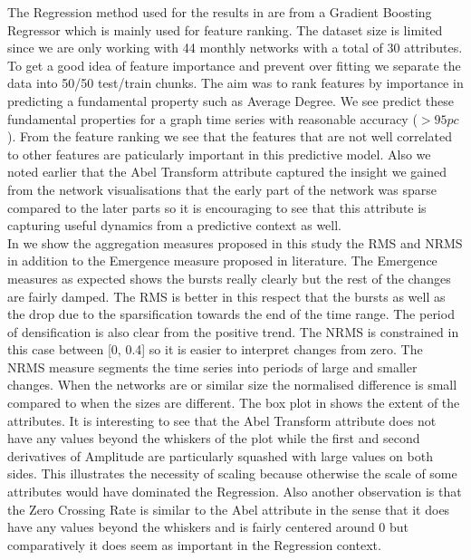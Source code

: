 The Regression method used for the results in  are from a Gradient Boosting Regressor which is mainly used for feature ranking. The dataset size is limited since we are only working with 44 monthly networks with a total of 30 attributes. To get a good idea of feature importance and prevent over fitting we separate the data into 50/50 test/train chunks. The aim was to rank features by importance in predicting a fundamental property such as Average Degree. We see predict these fundamental properties for a graph time series with reasonable accuracy ($> 95pc$). From the feature ranking we see that the features that are not well correlated to other features are paticularly important in this predictive model. Also we noted earlier that the Abel Transform attribute captured the insight we gained from the network visualisations that the early part of the network was sparse compared to the later parts so it is encouraging to see that this attribute is capturing useful dynamics from a predictive context as well. \\

In  we show the aggregation measures proposed in this study the RMS and NRMS in addition to the Emergence measure proposed in literature. The Emergence measures as expected shows the bursts really clearly but the rest of the changes are fairly damped. The RMS is better in this respect that the bursts as well as the drop due to the sparsification towards the end of the time range. The period of densification is also clear from the positive trend. The NRMS is constrained in this case between [0, 0.4] so it is easier to interpret changes from zero. The NRMS measure segments the time series into periods of large and smaller changes. When the networks are or similar size the normalised difference is small compared to when the sizes are different. The box plot in  shows the extent of the attributes. It is interesting to see that the Abel Transform attribute does not have any values beyond the whiskers of the plot while the first and second derivatives of Amplitude are particularly squashed with large values on both sides. This illustrates the necessity of scaling because otherwise the scale of some attributes would have dominated the Regression. Also another observation is that the Zero Crossing Rate is similar to the Abel attribute in the sense that it does have any values beyond the whiskers and is fairly centered around 0 but comparatively it does seem as important in the Regression context.  \\

